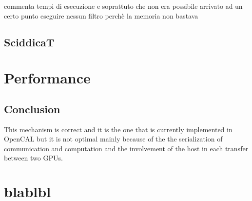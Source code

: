 commenta tempi di esecuzione e soprattuto che non era possibile arrivato ad un certo punto eseguire nessun filtro perchè la memoria non bastava


\subsection{SciddicaT}



\section{Performance}


\subsection{Conclusion}
This mechanism is correct and it is the one that is currently implemented in OpenCAL but it is not optimal mainly because of the the serialization of communication and computation and the involvement of the host in each transfer between two GPUs.





\section{blablbl}